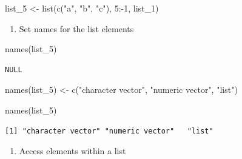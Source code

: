 \documentclass[
  letterpaper,
  DIV=11,
  numbers=noendperiod]{scrreprt}
\newenvironment{Shaded}{\begin{snugshade}}{\end{snugshade}}
\newcommand{\DecValTok}[1]{\textcolor[rgb]{0.68,0.00,0.00}{#1}}
\newcommand{\FunctionTok}[1]{\textcolor[rgb]{0.28,0.35,0.67}{#1}}
\newcommand{\NormalTok}[1]{\textcolor[rgb]{0.00,0.23,0.31}{#1}}
\newcommand{\OtherTok}[1]{\textcolor[rgb]{0.00,0.23,0.31}{#1}}
\newcommand{\SpecialCharTok}[1]{\textcolor[rgb]{0.37,0.37,0.37}{#1}}
\newcommand{\StringTok}[1]{\textcolor[rgb]{0.13,0.47,0.30}{#1}}
\providecommand{\tightlist}{%
  \setlength{\itemsep}{0pt}\setlength{\parskip}{0pt}}\usepackage{longtable,booktabs,array}
\begin{document}
\begin{Shaded}
\begin{Highlighting}[]
\NormalTok{list\_5 }\OtherTok{\textless{}{-}} \FunctionTok{list}\NormalTok{(}\FunctionTok{c}\NormalTok{(}\StringTok{"a"}\NormalTok{, }\StringTok{"b"}\NormalTok{, }\StringTok{"c"}\NormalTok{), }\DecValTok{5}\SpecialCharTok{:{-}}\DecValTok{1}\NormalTok{, list\_1)}
\end{Highlighting}
\end{Shaded}

\begin{enumerate}
\def\labelenumi{\alph{enumi}.}
\setcounter{enumi}{5}
\tightlist
\item
  Set names for the list elements
\end{enumerate}

\begin{Shaded}
\begin{Highlighting}[]
\FunctionTok{names}\NormalTok{(list\_5)}
\end{Highlighting}
\end{Shaded}

\begin{verbatim}
NULL
\end{verbatim}

\begin{Shaded}
\begin{Highlighting}[]
\FunctionTok{names}\NormalTok{(list\_5) }\OtherTok{\textless{}{-}} \FunctionTok{c}\NormalTok{(}\StringTok{"character vector"}\NormalTok{, }\StringTok{"numeric vector"}\NormalTok{, }\StringTok{"list"}\NormalTok{)}
\end{Highlighting}
\end{Shaded}

\begin{Shaded}
\begin{Highlighting}[]
\FunctionTok{names}\NormalTok{(list\_5)}
\end{Highlighting}
\end{Shaded}

\begin{verbatim}
[1] "character vector" "numeric vector"   "list"            
\end{verbatim}

\begin{enumerate}
\def\labelenumi{\alph{enumi}.}
\setcounter{enumi}{6}
\tightlist
\item
  Access elements within a list
\end{enumerate}
\end{document}
